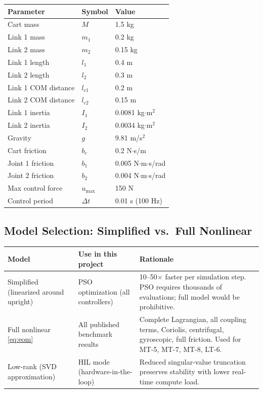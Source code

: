 \documentclass[11pt, a4paper]{article}
\begin{document}
\begin{center}
\begin{tabular}{@{}lll@{}}
\toprule
\textbf{Parameter} & \textbf{Symbol} & \textbf{Value} \\
\midrule
Cart mass                & $M$        & 1.5 kg \\
Link 1 mass              & $m_1$      & 0.2 kg \\
Link 2 mass              & $m_2$      & 0.15 kg \\
Link 1 length            & $l_1$      & 0.4 m \\
Link 2 length            & $l_2$      & 0.3 m \\
Link 1 COM distance      & $l_{c1}$   & 0.2 m \\
Link 2 COM distance      & $l_{c2}$   & 0.15 m \\
Link 1 inertia           & $I_1$      & 0.0081 kg$\cdot$m$^2$ \\
Link 2 inertia           & $I_2$      & 0.0034 kg$\cdot$m$^2$ \\
Gravity                  & $g$        & 9.81 m/s$^2$ \\
Cart friction            & $b_c$      & 0.2 N$\cdot$s/m \\
Joint 1 friction         & $b_1$      & 0.005 N$\cdot$m$\cdot$s/rad \\
Joint 2 friction         & $b_2$      & 0.004 N$\cdot$m$\cdot$s/rad \\
Max control force        & $u_\text{max}$ & 150 N \\
Control period           & $\Delta t$ & 0.01 s (100 Hz) \\
\bottomrule
\end{tabular}
\end{center}

\subsection{Model Selection: Simplified vs.\ Full Nonlinear}
\label{sec:modelchoice}

\begin{center}
\begin{tabular}{@{}p{3.5cm}p{4.2cm}p{4.8cm}@{}}
\toprule
\textbf{Model}        & \textbf{Use in this project}     & \textbf{Rationale} \\
\midrule
Simplified (linearized around upright) &
  PSO optimization (all controllers) &
  10--50$\times$ faster per simulation step. PSO requires
  thousands of evaluations; full model would be prohibitive. \\[0.5em]
Full nonlinear \eqref{eq:eom} &
  All published benchmark results &
  Complete Lagrangian, all coupling terms, Coriolis, centrifugal,
  gyroscopic, full friction. Used for MT-5, MT-7, MT-8, LT-6. \\[0.5em]
Low-rank (SVD approximation) &
  HIL mode (hardware-in-the-loop) &
  Reduced singular-value truncation preserves stability
  with lower real-time compute load. \\
\bottomrule
\end{tabular}
\end{center}
\end{document}
